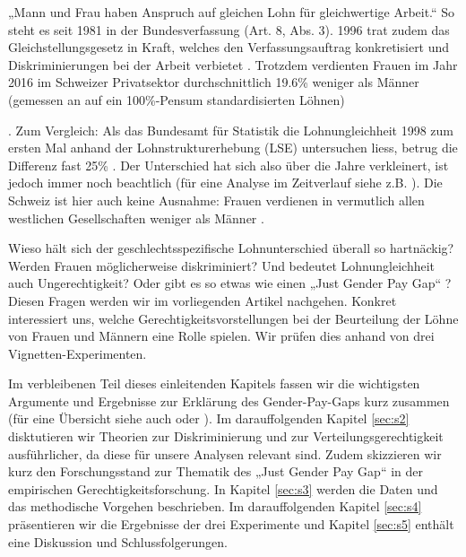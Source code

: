 \documentclass[a4paper,12pt]{article}
\renewcommand{\baselinestretch}{1.1}
\newif\ifcomments
\newcommand{\comment}[1]{%
    \ifcomments\marginpar{\renewcommand{\baselinestretch}{1}\tiny\hspace*{-1.1em}\colorbox{gray!20}%
    {\textcolor{red}{\parbox[t]{.9in}{\raggedright #1}}}}\fi}
\begin{document}
\comment{Hinweis auf Heiratsrecht bis 1988: “Note that this arrangement was enshrined 
in Switzerland’s marriage law until 1988, giving husbands the status as legal 
head of family from whom wives needed the consent in order to take on paid employment.” 
(Paper von Benita und Oli Oesch im ESR; das paper sollte irgendwo zitiert werden)}

\comment{cite „Oesch:2017“ somewhere; see bibtex file}

\comment{OK, beide Artikel zitiert.}

 „Mann und Frau haben Anspruch auf gleichen Lohn für gleichwertige Arbeit.“ So steht es seit 1981 in der Bundesverfassung (Art. 8, Abs. 3). 1996 trat zudem das Gleichstellungsgesetz in Kraft, welches den Verfassungsauftrag konkretisiert und Diskriminierungen bei der Arbeit verbietet  \citep{EDI-2019}. Trotzdem verdienten Frauen im Jahr 2016 im Schweizer Privatsektor durchschnittlich 19.6\% weniger als Männer
(gemessen an auf ein 100\%-Pensum standardisierten Löhnen) \comment{Zahlen aktualisieren? -> Zahlen aktualisiert.}
\citep{BFS-2019a}. Zum Vergleich: Als das Bundesamt für Statistik die
Lohnungleichheit 1998 zum ersten Mal anhand der Lohnstrukturerhebung (LSE)
untersuchen liess, betrug die Differenz fast 25\% \citep{Strub-etal-2006}. Der
Unterschied hat sich also über die Jahre verkleinert, ist jedoch immer noch
beachtlich (für eine Analyse im Zeitverlauf siehe z.B. \citealp{Schmid-2016}). Die Schweiz ist hier auch keine Ausnahme: Frauen verdienen in vermutlich allen westlichen Gesellschaften weniger als Männer \citep{Blau-2016}.

Wieso hält sich der geschlechtsspezifische Lohnunterschied überall so hartnäckig? Werden Frauen möglicherweise diskriminiert? Und bedeutet Lohnungleichheit auch Ungerechtigkeit? Oder gibt es so etwas wie einen „Just Gender Pay Gap“ \citep{Jasso-Webster-1997,Sauer-2014}? Diesen Fragen werden wir im vorliegenden Artikel nachgehen. Konkret interessiert uns, welche Gerechtigkeitsvorstellungen bei der Beurteilung der Löhne von Frauen und Männern eine Rolle spielen. Wir prüfen dies anhand von drei Vignetten-Experimenten.
\comment{noch konkreter?}
Im verbleibenen Teil dieses einleitenden Kapitels fassen wir die wichtigsten Argumente und Ergebnisse zur Erklärung des Gender-Pay-Gaps kurz zusammen (für eine Übersicht siehe auch \citealp{Blau-Kahn-2017} oder \citealp{Weichselbaumer-Winter-Ebmer-2005}). Im darauffolgenden Kapitel \ref{sec:s2} disktutieren wir Theorien zur Diskriminierung und zur Verteilungsgerechtigkeit ausführlicher, da diese für unsere Analysen relevant sind. Zudem skizzieren wir kurz den Forschungsstand zur Thematik des „Just Gender Pay Gap“ in der empirischen Gerechtigkeitsforschung. In Kapitel \ref{sec:s3} werden die Daten und das methodische Vorgehen beschrieben. Im darauffolgenden Kapitel \ref{sec:s4} präsentieren wir die Ergebnisse der drei Experimente und Kapitel \ref{sec:s5} enthält eine Diskussion und Schlussfolgerungen.
\end{document}

